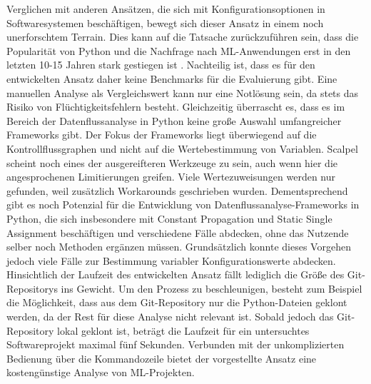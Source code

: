 \documentclass[german,bachelor]{swsLeipzig}
\begin{document}
\indent Verglichen mit anderen Ansätzen, die sich mit Konfigurationsoptionen in Softwaresystemen beschäftigen, bewegt sich
dieser Ansatz in einem noch unerforschtem Terrain.
Dies kann auf die Tatsache zurückzuführen sein, dass die Popularität von Python und die Nachfrage nach ML-Anwendungen erst
in den letzten 10-15 Jahren stark gestiegen ist \cite[]{srinath2017python}.
Nachteilig ist, dass es für den entwickelten Ansatz daher keine Benchmarks für die Evaluierung gibt.
Eine manuellen Analyse als Vergleichswert kann nur eine Notlösung sein, da stets das Risiko von Flüchtigkeitsfehlern besteht.
Gleichzeitig überrascht es, dass es im Bereich der Datenflussanalyse in Python keine große Auswahl umfangreicher Frameworks
gibt.
Der Fokus der Frameworks liegt überwiegend auf die Kontrollflussgraphen und nicht auf die Wertebestimmung von Variablen.
Scalpel scheint noch eines der ausgereifteren Werkzeuge zu sein, auch wenn hier die angesprochenen
Limitierungen greifen.
Viele Wertezuweisungen werden nur gefunden, weil zusätzlich Workarounds geschrieben wurden.
Dementsprechend gibt es noch Potenzial für die Entwicklung von Datenflussanalyse-Frameworks in Python, die sich
insbesondere mit Constant Propagation und Static Single Assignment beschäftigen und verschiedene Fälle abdecken, ohne das
Nutzende selber noch Methoden ergänzen müssen.
Grundsätzlich konnte dieses Vorgehen jedoch viele Fälle zur Bestimmung variabler Konfigurationswerte abdecken.\\
\indent Hinsichtlich der Laufzeit des entwickelten Ansatz fällt lediglich die Größe des Git-Repositorys ins Gewicht.
Um den Prozess zu beschleunigen, besteht zum Beispiel die Möglichkeit, dass aus dem Git-Repository nur die Python-Dateien
geklont werden, da der Rest für diese Analyse nicht relevant ist.
Sobald jedoch das Git-Repository lokal geklont ist, beträgt die Laufzeit für ein untersuchtes Softwareprojekt maximal fünf Sekunden.
Verbunden mit der unkomplizierten Bedienung über die Kommandozeile bietet der vorgestellte Ansatz eine kostengünstige Analyse
von ML-Projekten.


\end{document}
